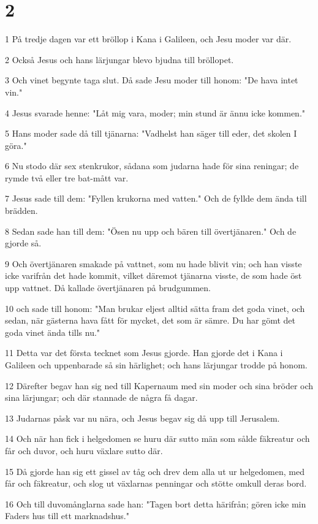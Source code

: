 \chapter{2}

\par 1 På tredje dagen var ett bröllop i Kana i Galileen, och Jesu moder var där.
\par 2 Också Jesus och hans lärjungar blevo bjudna till bröllopet.
\par 3 Och vinet begynte taga slut. Då sade Jesu moder till honom: "De hava intet vin."
\par 4 Jesus svarade henne: "Låt mig vara, moder; min stund är ännu icke kommen."
\par 5 Hans moder sade då till tjänarna: "Vadhelst han säger till eder, det skolen I göra."
\par 6 Nu stodo där sex stenkrukor, sådana som judarna hade för sina reningar; de rymde två eller tre bat-mått var.
\par 7 Jesus sade till dem: "Fyllen krukorna med vatten." Och de fyllde dem ända till brädden.
\par 8 Sedan sade han till dem: "Ösen nu upp och bären till övertjänaren." Och de gjorde så.
\par 9 Och övertjänaren smakade på vattnet, som nu hade blivit vin; och han visste icke varifrån det hade kommit, vilket däremot tjänarna visste, de som hade öst upp vattnet. Då kallade övertjänaren på brudgummen.
\par 10 och sade till honom: "Man brukar eljest alltid sätta fram det goda vinet, och sedan, när gästerna hava fått för mycket, det som är sämre. Du har gömt det goda vinet ända tills nu."
\par 11 Detta var det första tecknet som Jesus gjorde. Han gjorde det i Kana i Galileen och uppenbarade så sin härlighet; och hans lärjungar trodde på honom.
\par 12 Därefter begav han sig ned till Kapernaum med sin moder och sina bröder och sina lärjungar; och där stannade de några få dagar.
\par 13 Judarnas påsk var nu nära, och Jesus begav sig då upp till Jerusalem.
\par 14 Och när han fick i helgedomen se huru där sutto män som sålde fäkreatur och får och duvor, och huru växlare sutto där.
\par 15 Då gjorde han sig ett gissel av tåg och drev dem alla ut ur helgedomen, med får och fäkreatur, och slog ut växlarnas penningar och stötte omkull deras bord.
\par 16 Och till duvomånglarna sade han: "Tagen bort detta härifrån; gören icke min Faders hus till ett marknadshus."
